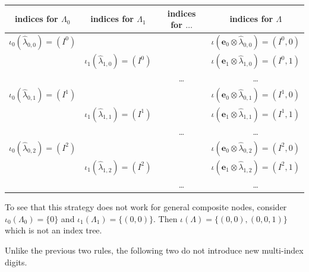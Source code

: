 \documentclass[a4paper,10pt,headings=normal,bibliography=totoc]{scrartcl}
\begin{document}
\begin{itemize}
    \begin{tabular}{c|c|c|c}
      indices for $\Lambda_0$ &
      indices for $\Lambda_1$ &
      indices for $\dots$ &
      indices for $\Lambda$ \\
      \hline
      $\iota_0(\hat{\lambda}_{0,0}) = (I^0)$ & & &
        $\iota(\mathbf{e}_0 \otimes \hat{\lambda}_{0,0}) = (I^0,0)$ \\
      & $\iota_1(\hat{\lambda}_{1,0}) = (I^0)$ & &
        $\iota(\mathbf{e}_1 \otimes \hat{\lambda}_{1,0}) = (I^0,1)$ \\
      & & \dots &
        \dots \\
      $\iota_0(\hat{\lambda}_{0,1}) = (I^1)$ & & &
        $\iota(\mathbf{e}_0 \otimes \hat{\lambda}_{0,1}) = (I^1,0)$ \\
      & $\iota_1(\hat{\lambda}_{1,1}) = (I^1)$ & &
        $\iota(\mathbf{e}_1 \otimes \hat{\lambda}_{1,1}) = (I^1,1)$ \\
      & & \dots &
        \dots \\
      $\iota_0(\hat{\lambda}_{0,2}) = (I^2)$ & & &
        $\iota(\mathbf{e}_0 \otimes \hat{\lambda}_{0,2}) = (I^2,0)$ \\
      & $\iota_1(\hat{\lambda}_{1,2}) = (I^2)$ & &
        $\iota(\mathbf{e}_1 \otimes \hat{\lambda}_{1,2}) = (I^2,1)$ \\
      & & \dots &
        \dots \\
    \end{tabular}

    To see that this strategy does not work for general composite nodes,
    consider $\iota_0(\Lambda_0) = \{0\}$ and $\iota_1(\Lambda_1) = \{(0,0)\}$.
    Then $\iota(\Lambda) = \{(0,0), (0,0,1)\}$ which is not an index tree.
\end{itemize}
Unlike the previous two rules, the following two do not introduce new
multi-index digits.
\end{document}
